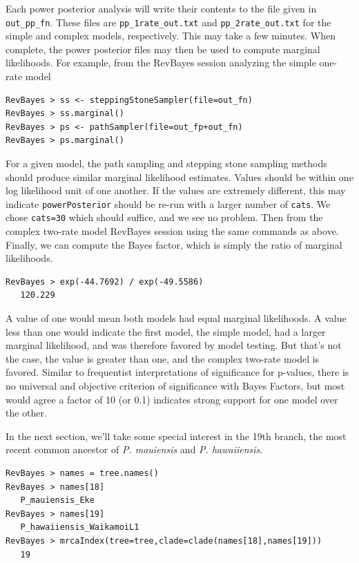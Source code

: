 \documentclass[11pt]{article}
\begin{document}
Each power posterior analysis will write their contents to the file given in {\tt out\_pp\_fn}.
These files are {\tt pp\_1rate\_out.txt} and {\tt pp\_2rate\_out.txt} for the simple and complex models, respectively.
This may take a few minutes.
When complete, the power posterior files may then be used to compute marginal likelihoods.
For example, from the RevBayes session analyzing the simple one-rate model

\begin{snugshade}
\begin{lstlisting}
RevBayes > ss <- steppingStoneSampler(file=out_fn)
RevBayes > ss.marginal() 
RevBayes > ps <- pathSampler(file=out_fp+out_fn)
RevBayes > ps.marginal() 
\end{lstlisting}
\end{snugshade}

For a given model, the path sampling and stepping stone sampling methods should produce similar marginal likelihood estimates.
Values should be within one log likelihood unit of one another.
If the values are extremely different, this may indicate {\tt powerPosterior} should be re-run with a larger number of {\tt cats}.
We chose {\tt cats=30} which should suffice, and we see no problem.
Then from the complex two-rate model RevBayes session using the same commands as above.
Finally, we can compute the Bayes factor, which is simply the ratio of marginal likelihoods.

\begin{snugshade}
\begin{lstlisting}
RevBayes > exp(-44.7692) / exp(-49.5586)
   120.229
\end{lstlisting}
\end{snugshade}

A value of one would mean both models had equal marginal likelihoods.
A value less than one would indicate the first model, the simple model, had a larger marginal likelihood, and was therefore favored by model testing.
But that's not the case, the value is greater than one, and the complex two-rate model is favored.
Similar to frequentist interpretations of significance for p-values, there is no universal and objective criterion of significance with Bayes Factors, but most would agree a factor of 10 (or 0.1) indicates strong support for one model over the other.

In the next section, we'll take some special interest in the 19th branch, the most recent common ancestor of {\it P. mauiensis} and {\it P. hawaiiensis}.
\begin{snugshade}
\begin{lstlisting}
RevBayes > names = tree.names()
RevBayes > names[18]
   P_mauiensis_Eke
RevBayes > names[19]
   P_hawaiiensis_WaikamoiL1
RevBayes > mrcaIndex(tree=tree,clade=clade(names[18],names[19]))
   19
\end{lstlisting}
\end{snugshade}
\end{document}
